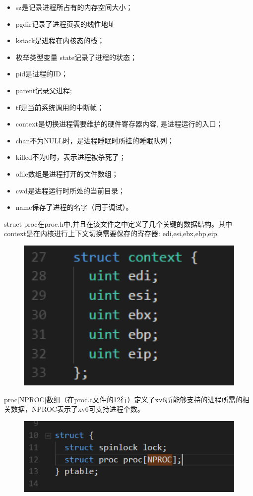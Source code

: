 \documentclass[a4paper,12pt]{report}
\begin{document}
\begin{itemize}
  \item 	sz是记录进程所占有的内存空间大小；
  \item 	pgdir记录了进程页表的线性地址
  \item 	kstack是进程在内核态的栈；
  \item 	枚举类型变量 state记录了进程的状态；
  \item 	pid是进程的ID；
  \item 	parent记录父进程;
  \item 	tf是当前系统调用的中断帧；
  \item 	context是切换进程需要维护的硬件寄存器内容, 是进程运行的入口；
  \item 	chan不为NULL时，是进程睡眠时所挂的睡眠队列；
  \item 	killed不为0时，表示进程被杀死了；
  \item 	ofile数组是进程打开的文件数组；
  \item 	cwd是进程运行时所处的当前目录；
  \item 	name保存了进程的名字（用于调试）。

\end{itemize}
struct proc在proc.h中,并且在该文件之中定义了几个关键的数据结构。其中context是在内核进行上下文切换需要保存的寄存器: edi,esi,ebx,ebp,eip.
\begin{figure}[H]
	\centering
	\includegraphics [width=1.0\textwidth]{figure//image98.png}
\end{figure}


proc[NPROC]数组（在proc.c文件的12行）定义了xv6所能够支持的进程所需的相关数据，NPROC表示了xv6可支持进程个数。
\begin{figure}[H]
	\centering
	\includegraphics [width=1.0\textwidth]{figure//image99.png}
\end{figure}
\end{document}
